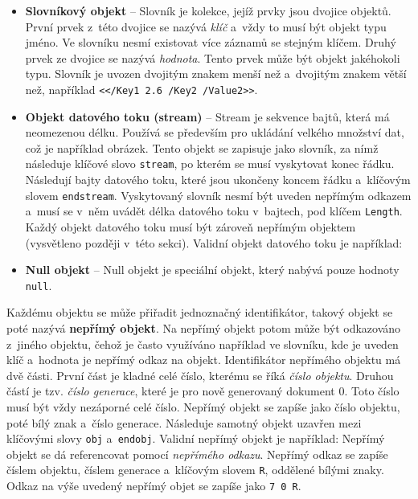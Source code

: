 \begin{itemize}
    \item \textbf{Slovníkový objekt} -- Slovník je kolekce, jejíž prvky jsou
    dvojice objektů. První prvek z~této dvojice se nazývá \emph{klíč} a~vždy to 
    musí být objekt typu jméno. Ve slovníku nesmí existovat více záznamů se
    stejným klíčem. Druhý prvek ze dvojice se nazývá \emph{hodnota}.
    Tento prvek může být objekt jakéhokoli typu. Slovník je uvozen dvojitým znakem
    menší než a~dvojitým znakem větší než, například
    \texttt{<</Key1 2.6 /Key2 /Value2>>}.

    \item \textbf{Objekt datového toku (stream)} -- Stream je sekvence bajtů, 
    která má neomezenou délku. Používá se především pro ukládání velkého množství
    dat, což je například obrázek. Tento objekt se zapisuje jako slovník, za nímž
    následuje klíčové slovo \texttt{stream}, po kterém se musí vyskytovat konec
    řádku. Následují bajty datového toku, které jsou ukončeny koncem řádku
    a~klíčovým slovem \texttt{endstream}. Vyskytovaný slovník nesmí být uveden
    nepřímým odkazem a~musí se v~něm uvádět délka datového toku v~bajtech, pod
    klíčem \texttt{Length}. Každý objekt datového toku musí být zároveň nepřímým
    objektem (vysvětleno později v~této sekci). Validní objekt datového toku je
    například:

    \item \textbf{Null objekt} -- Null objekt je speciální objekt, který nabývá
    pouze hodnoty \texttt{null}.
\end{itemize}

Každému objektu se může přiřadit jednoznačný identifikátor, takový objekt se poté
nazývá \textbf{nepřímý objekt}. Na nepřímý objekt potom může být odkazováno
z~jiného objektu, čehož je často využíváno například ve slovníku, kde je uveden
klíč a~hodnota je nepřímý odkaz na objekt. Identifikátor nepřímého objektu má dvě
části. První část je kladné celé číslo, kterému se říká \emph{číslo objektu}.
Druhou částí je tzv. \emph{číslo generace}, které je pro nově generovaný dokument
0. Toto číslo musí být vždy nezáporné celé číslo. Nepřímý objekt se zapíše jako
číslo objektu, poté bílý znak a~číslo generace. Následuje samotný objekt uzavřen
mezi klíčovými slovy \texttt{obj} a~\texttt{endobj}. Validní nepřímý objekt je
například:
\noindent Nepřímý objekt se dá referencovat pomocí \emph{nepřímého odkazu}. Nepřímý odkaz
se zapíše číslem objektu, číslem generace a~klíčovým slovem \texttt{R}, oddělené
bílými znaky. Odkaz na výše uvedený nepřímý objet se zapíše jako \texttt{7 0 R}.


